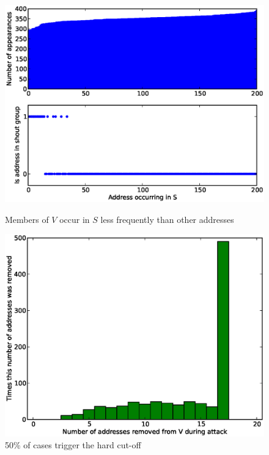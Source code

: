 \documentclass[ %
                    author={Luke Murray},
                supervisor={Dr. Simon Hollis},
                     title={Shadow Peer-to-Peer Networks},
                  subtitle={},
                    degree={MEng},
                      year={2013} ]{thesis}
\begin{document}
\begin{figure}[h]
    \centering
    \begin{minipage}[b]{0.4\linewidth}
        \centering
        \includegraphics[width=\linewidth]{diagrams/binomial1.eps}
        \caption{Members of $V$ occur in $S$ less frequently than other addresses}
        \label{threshold_attack1}
    \end{minipage}
    \hspace{0.5cm}
    \begin{minipage}[b]{0.4\linewidth}
        \centering
        \includegraphics[width=\linewidth]{diagrams/binomial2.eps}
        \caption{50\% of cases trigger the hard cut-off}
        \label{threshold_attack2}
    \end{minipage}
\end{figure}
\end{document}
